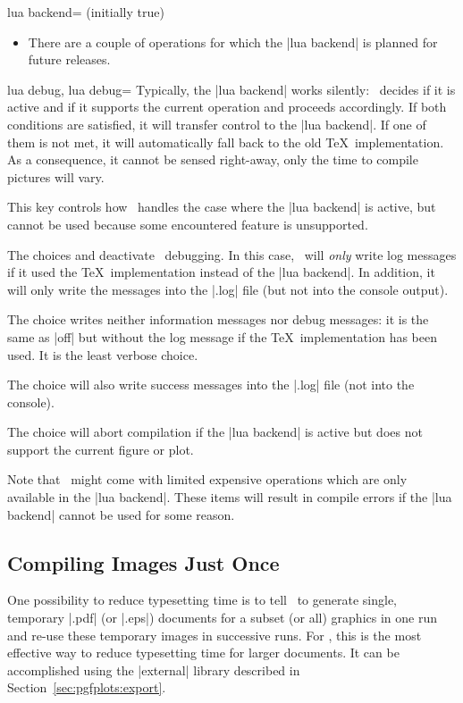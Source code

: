 {\begin{pgfplotskey}{lua backend= (initially true)}
\begin{itemize}
		\item There are a couple of operations for which the |lua backend| is planned for future releases.
	\end{itemize}
\end{pgfplotskey}

\begin{pgfplotskeylist}{lua debug, lua debug=}
	Typically, the |lua backend| works silently: \PGFPlots\ decides if it is active and if it supports the current operation and proceeds accordingly. If both conditions are satisfied, it will transfer control to the |lua backend|. If one of them is not met, it will automatically fall back to the old \TeX\ implementation. As a consequence, it cannot be sensed right-away, only the time to compile pictures will vary.

	This key controls how \PGFPlots\ handles the case where the |lua backend| is active, but cannot be used because some encountered feature is unsupported.

	The choices  and  deactivate \lua\ debugging. In this case, \PGFPlots\ will \emph{only} write log messages if it used the \TeX\ implementation instead of the |lua backend|. In addition, it will only write the messages into the |.log| file (but not into the console output).

	The choice  writes neither information messages nor debug messages: it is the same as |off| but without the log message if the \TeX\ implementation has been used. It is the least verbose choice.
	
	The choice  will also write success messages into the |.log| file (not into the console).

	The choice  will abort compilation if the |lua backend| is active but does not support the current figure or plot.

	Note that \PGFPlots\ might come with limited expensive operations which are only available in the |lua backend|. These items will result in compile errors if the |lua backend| cannot be used for some reason.
\end{pgfplotskeylist}

\subsection{Compiling Images Just Once}
One possibility to reduce typesetting time is to tell \PGF\ to generate single, temporary |.pdf| (or |.eps|) documents for a subset (or all) graphics in one run and re-use these temporary images in successive runs. For \PGFPlots, this is the most effective way to reduce typesetting time for larger documents. It can be accomplished using the |external| library described in Section~\ref{sec:pgfplots:export}.
}
